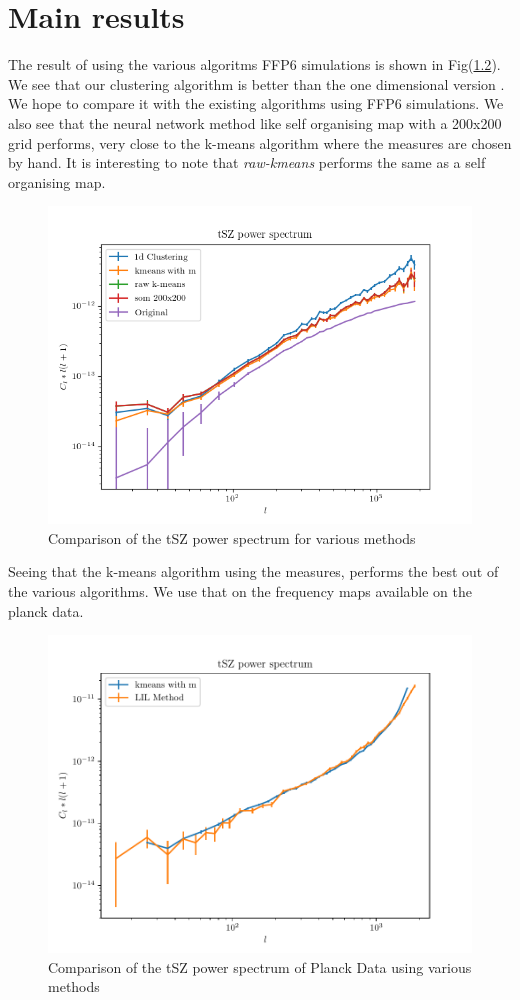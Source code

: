 \chapter{Main results}
\label{results}

      The result of using the various algoritms FFP6 simulations is shown in Fig(\ref{results}).
We see that our clustering algorithm is better than the one dimensional version \cite{datarishi}.
We hope to compare it with the existing algorithms using FFP6 simulations. We also see that the
neural network method like self organising map with a 200x200 grid performs, very close to the
k-means algorithm where the measures are chosen by hand. It is interesting to note that
\emph{raw-kmeans} performs the same as a self organising map.
\begin{figure}[H]
  \centering
  \label{results}
  \includegraphics[width=0.7\linewidth]{cl_plots.png}
  \caption{Comparison of the tSZ power spectrum for various methods}
\end{figure}

Seeing that the k-means algorithm using the measures, performs the best out of the various algorithms.
We use that on the frequency maps available on the planck data.

\begin{figure}[H]
  \centering
  \label{results}
  \includegraphics[width=0.7\linewidth]{sz_spec.pdf}
  \caption{Comparison of the tSZ power spectrum of Planck Data using various methods}
\end{figure}

